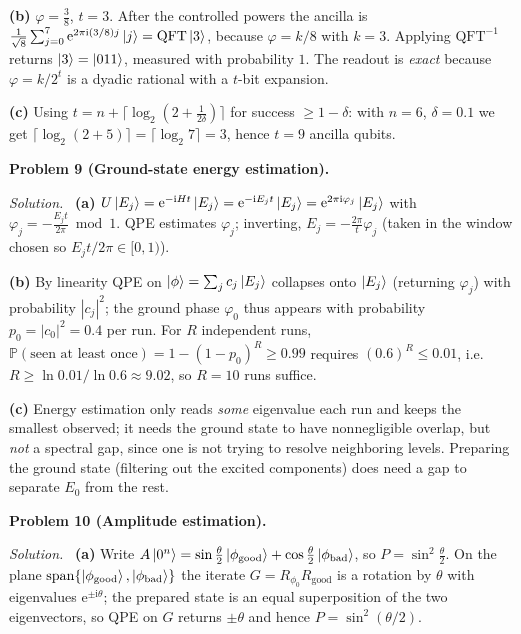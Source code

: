 \documentclass[11pt]{article}
\newcommand{\Prob}{\mathbb{P}}
\newcommand{\ii}{\mathrm{i}}
\newcommand{\ee}{\mathrm{e}}
\newcommand{\abs}[1]{\left\lvert #1 \right\rvert}
\newcommand{\QFT}{\mathrm{QFT}}
\newcommand{\sol}{\smallskip\noindent\textit{Solution.}\ }
\newcommand{\problem}[1]{\bigskip\noindent\textbf{Problem #1.}\ }
\begin{document}
\textbf{(b)} $\varphi=\tfrac38$, $t=3$. After the controlled powers the ancilla is
$\tfrac1{\sqrt8}\sum_{j=0}^{7}\ee^{2\pi\ii(3/8)j}\ket j=\QFT\ket3$, because
$\varphi=k/8$ with $k=3$. Applying $\QFT^{-1}$ returns $\ket3=\ket{011}$, measured with
probability $1$. The readout is \emph{exact} because $\varphi=k/2^t$ is a dyadic
rational with a $t$-bit expansion.

\textbf{(c)} Using $t=n+\lceil\log_2(2+\tfrac1{2\delta})\rceil$ for success
$\ge1-\delta$: with $n=6$, $\delta=0.1$ we get
$\lceil\log_2(2+5)\rceil=\lceil\log_2 7\rceil=3$, hence $t=9$ ancilla qubits.

\problem{9 (Ground-state energy estimation)}

\sol
\textbf{(a)} $U\ket{E_j}=\ee^{-\ii H t}\ket{E_j}=\ee^{-\ii E_j t}\ket{E_j}
=\ee^{2\pi\ii\varphi_j}\ket{E_j}$ with $\varphi_j=-\tfrac{E_j t}{2\pi}\bmod1$. QPE
estimates $\varphi_j$; inverting, $E_j=-\tfrac{2\pi}{t}\varphi_j$ (taken in the window
chosen so $E_j t/2\pi\in[0,1)$).

\textbf{(b)} By linearity QPE on $\ket\phi=\sum_j c_j\ket{E_j}$ collapses onto
$\ket{E_j}$ (returning $\varphi_j$) with probability $\abs{c_j}^2$; the ground phase
$\varphi_0$ thus appears with probability $p_0=\abs{c_0}^2=0.4$ per run. For $R$
independent runs, $\Prob(\text{seen at least once})=1-(1-p_0)^R\ge0.99$ requires
$(0.6)^R\le0.01$, i.e.\ $R\ge\ln0.01/\ln0.6\approx9.02$, so $R=10$ runs suffice.

\textbf{(c)} Energy estimation only reads \emph{some} eigenvalue each run and keeps
the smallest observed; it needs the ground state to have nonnegligible overlap, but
\emph{not} a spectral gap, since one is not trying to resolve neighboring levels.
Preparing the ground state (filtering out the excited components) does need a gap to
separate $E_0$ from the rest.

\problem{10 (Amplitude estimation)}

\sol
\textbf{(a)} Write $A\ket{0^n}=\sin\tfrac\theta2\ket{\phi_{\mathrm{good}}}
+\cos\tfrac\theta2\ket{\phi_{\mathrm{bad}}}$, so $P=\sin^2\tfrac\theta2$. On the plane
$\operatorname{span}\{\ket{\phi_{\mathrm{good}}},\ket{\phi_{\mathrm{bad}}}\}$ the
iterate $G=R_{\phi_0}R_{\mathrm{good}}$ is a rotation by $\theta$ with eigenvalues
$\ee^{\pm\ii\theta}$; the prepared state is an equal superposition of the two
eigenvectors, so QPE on $G$ returns $\pm\theta$ and hence $P=\sin^2(\theta/2)$.
\end{document}
